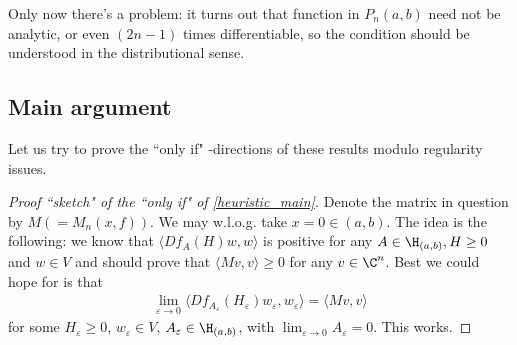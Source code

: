 Only now there's a problem: it turns out that function in $P_{n}(a, b)$ need not be analytic, or even $(2 n - 1)$ times differentiable, so the condition should be understood in the distributional sense.

\subsection{Main argument}

Let us try to prove the ``only if" -directions of these results modulo regularity issues.

\begin{proof}[Proof ``sketch" of the ``only if" of \ref{heuristic_main}]
	Denote the matrix in question by $M (= M_{n}(x, f))$. We may w.l.o.g. take $x = 0 \in (a, b)$. The idea is the following: we know that $\langle D f_{A} (H) w, w \rangle$ is positive for any $A \in \H_{(a, b)}, H \geq 0$ and $w \in V$ and should prove that $\langle M v, v \rangle \geq 0$ for any $v \in \C^{n}$. Best we could hope for is that
	\begin{align*}
		\lim_{\varepsilon \to 0} \langle D f_{A_{\varepsilon}} (H_{\varepsilon}) w_{\varepsilon}, w_{\varepsilon} \rangle = \langle M v, v \rangle
	\end{align*}
	for some $H_{\varepsilon} \geq 0$, $w_{\varepsilon} \in V$, $A_{\varepsilon} \in \H_{(a, b)}$, with $\lim_{\varepsilon \to 0} A_{\varepsilon} = 0$. This works.


\end{proof}
